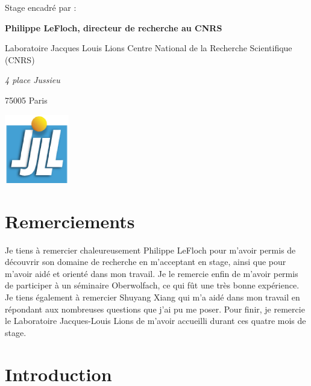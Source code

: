 \documentclass[11pt,a4paper]{article}
\begin{document}
\begin{center}
\vspace{0.5cm}

\parbox{15cm}{
Stage encadré par :

{\bf Philippe LeFloch, directeur de recherche au CNRS}

Laboratoire Jacques Louis Lions\newline
Centre National de la Recherche Scientifique (CNRS)

{\it 4 place Jussieu

75005 Paris}

} %

\vspace{0.5cm}

\includegraphics[height=3cm]{logos/logo_ljll.eps}

\end{center}

\vfill

\newpage
\thispagestyle{empty}
\section*{Remerciements}
Je tiens à remercier chaleureusement Philippe LeFloch pour m'avoir permis de découvrir son domaine de recherche en m'acceptant en stage, ainsi que pour m'avoir aidé et orienté dans mon travail. Je le remercie enfin de m'avoir permis de participer à un séminaire Oberwolfach, ce qui fût une très bonne expérience.\newline
Je tiens également à remercier Shuyang Xiang qui m'a aidé dans mon travail en répondant aux nombreuses questions que j'ai pu me poser.\newline
Pour finir, je remercie le Laboratoire Jacques-Louis Lions de m'avoir accueilli durant ces quatre mois de stage.
\tableofcontents
\newpage

\setcounter{page}{1}

\setlength{\parindent}{16pt}

\section{Introduction}
\end{document}

